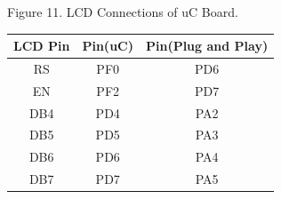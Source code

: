 \documentclass[a4paper,10pt,oneside]{article}
\begin{document}
{\begin{center}
		Figure 11. LCD Connections of uC Board.\\
		\begin{tabular}{|c|c|c|}
			\hline
			LCD Pin&Pin(uC)&Pin(Plug and Play)\\
			\hline
			RS&PF0&PD6\\
			\hline
			EN&PF2&PD7\\
			\hline
			DB4&PD4&PA2\\
			\hline
			DB5&PD5&PA3\\
			\hline
			DB6&PD6&PA4\\
			\hline
			DB7&PD7&PA5\\
			\hline
		\end{tabular}
		\end{center}
}
\end{document}
